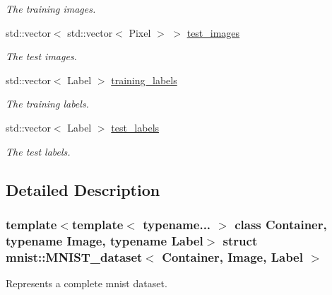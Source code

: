 \begin{DoxyCompactItemize}
\begin{DoxyCompactList}\small\item\em The training images. \end{DoxyCompactList}\item 
\mbox{\label{structmnist_1_1MNIST__dataset_a356e1f3b4b93881fee1177457bbf19d7}} 
std\+::vector$<$ std\+::vector$<$ Pixel $>$ $>$ \hyperlink{structmnist_1_1MNIST__dataset_a356e1f3b4b93881fee1177457bbf19d7}{test\+\_\+images}
\begin{DoxyCompactList}\small\item\em The test images. \end{DoxyCompactList}\item 
\mbox{\label{structmnist_1_1MNIST__dataset_a6ae699e19d22f5b0dc8189ae3922c852}} 
std\+::vector$<$ Label $>$ \hyperlink{structmnist_1_1MNIST__dataset_a6ae699e19d22f5b0dc8189ae3922c852}{training\+\_\+labels}
\begin{DoxyCompactList}\small\item\em The training labels. \end{DoxyCompactList}\item 
\mbox{\label{structmnist_1_1MNIST__dataset_a79e464df42d7f58abcf948a342cfe751}} 
std\+::vector$<$ Label $>$ \hyperlink{structmnist_1_1MNIST__dataset_a79e464df42d7f58abcf948a342cfe751}{test\+\_\+labels}
\begin{DoxyCompactList}\small\item\em The test labels. \end{DoxyCompactList}\end{DoxyCompactItemize}


\subsection{Detailed Description}
\subsubsection*{template$<$template$<$ typename... $>$ class Container, typename Image, typename Label$>$\newline
struct mnist\+::\+M\+N\+I\+S\+T\+\_\+dataset$<$ Container, Image, Label $>$}

Represents a complete mnist dataset. 


